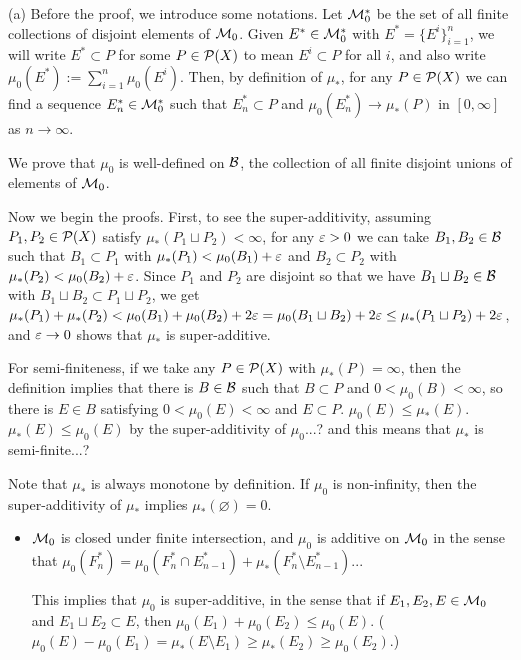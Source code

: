 \documentclass{../../large}
\begin{document}
\begin{pf}
(a)
Before the proof, we introduce some notations.
Let $\mathcal{M}_0^*$ be the set of all finite collections of disjoint elements of $\mathcal{M}_0$.
Given $E^*\in\mathcal{M}_0^*$ with $E^*=\{E^i\}_{i=1}^n$, we will write $E^*\subset P$ for some $P\in\mathcal{P}(X)$ to mean $E^i\subset P$ for all $i$, and also write $\mu_0(E^*):=\sum_{i=1}^n\mu_0(E^i)$.
Then, by definition of $\mu_*$, for any $P\in\mathcal{P}(X)$ we can find a sequence $E^*_n\in\mathcal{M}_0^*$ such that $E^*_n\subset P$ and $\mu_0(E^*_n)\to\mu_*(P)$ in $[0,\infty]$ as $n\to\infty$.

We prove that $\mu_0$ is well-defined on $\mathcal{B}$, the collection of all finite disjoint unions of elements of $\mathcal{M}_0$.



Now we begin the proofs.
First, to see the super-additivity, assuming $P_1,P_2\in\mathcal{P}(X)$ satisfy $\mu_*(P_1\sqcup P_2)<\infty$, for any $\varepsilon>0$ we can take $B_1,B_2\in\mathcal{B}$ such that $B_1\subset P_1$ with $\mu_*(P_1)<\mu_0(B_1)+\varepsilon$ and $B_2\subset P_2$ with $\mu_*(P_2)<\mu_0(B_2)+\varepsilon$.
Since $P_1$ and $P_2$ are disjoint so that we have $B_1\sqcup B_2\in\mathcal{B}$ with $B_1\sqcup B_2\subset P_1\sqcup P_2$, we get $\mu_*(P_1)+\mu_*(P_2)<\mu_0(B_1)+\mu_0(B_2)+2\varepsilon=\mu_0(B_1\sqcup B_2)+2\varepsilon\le\mu_*(P_1\sqcup P_2)+2\varepsilon$, and $\varepsilon\to0$ shows that $\mu_*$ is super-additive.

For semi-finiteness, if we take any $P\in\mathcal{P}(X)$ with $\mu_*(P)=\infty$, then the definition implies that there is $B\in\mathcal{B}$ such that $B\subset P$ and $0<\mu_0(B)<\infty$, so there is $E\in B$ satisfying $0<\mu_0(E)<\infty$ and $E\subset P$.
$\mu_0(E)\le\mu_*(E)$.
$\mu_*(E)\le\mu_0(E)$ by the super-additivity of $\mu_0$...?
and this means that $\mu_*$ is semi-finite...?





Note that $\mu_*$ is always monotone by definition.
If $\mu_0$ is non-infinity, then the super-additivity of $\mu_*$ implies $\mu_*(\varnothing)=0$.



\begin{itemize}
\item 
$\mathcal{M}_0$ is closed under finite intersection, and $\mu_0$ is additive on $\mathcal{M}_0$ in the sense that $\mu_0(F_n^*)=\mu_0(F_n^*\cap E_{n-1}^*)+\mu_*(F_n^*\setminus E_{n-1}^*)$...

This implies that $\mu_0$ is super-additive, in the sense that if $E_1,E_2,E\in\mathcal{M}_0$ and $E_1\sqcup E_2\subset E$, then $\mu_0(E_1)+\mu_0(E_2)\le\mu_0(E)$.
($\mu_0(E)-\mu_0(E_1)=\mu_*(E\setminus E_1)\ge\mu_*(E_2)\ge\mu_0(E_2)$.)


\end{itemize}
\end{pf}
\end{document}
